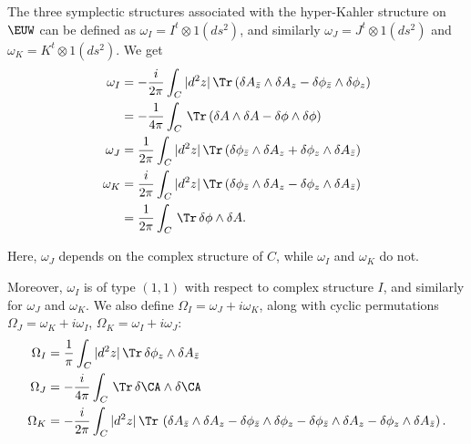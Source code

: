 \par{}

The three symplectic structures associated with the hyper-Kahler
structure on $\EUW$ can be defined as $\omega_I = I^t\otimes
1(ds^2)$, and similarly  $\omega_J=J^t\otimes 1(ds^2) $ and
$\omega_K=K^t\otimes 1(ds^2)$. We get %
\setcounter{equation}{7}
\begin{equation}\label{eq:tomog}
\begin{aligned}\omega_I
& = -{i\over 2\pi}\int_C|d^2z|\,\Tr\left(\delta A_{\bar z}\wedge
\delta A_z-\delta \phi_{\bar z}\wedge \delta\phi_z\right)\\
&=-{1\over 4\pi}\int_C\,\Tr\left(\delta A\wedge \delta A
-\delta\phi\wedge\delta \phi\right) \\
                      \omega_J & ={1\over 2\pi}\int_C |d^2z|\,\Tr\left(
                      \delta\phi_{\bar z}\wedge \delta A_z+\delta\phi_z\wedge
                      \delta A_{\bar z} \right)\\
                      \omega_K & =
                      {i\over 2\pi}\int_C|d^2z|\,\Tr\left(\delta\phi_{\bar z}
                      \wedge\delta A_z-\delta\phi_z\wedge\delta A_{\bar z}\right)\\
                      & = {1\over 2\pi}\int_C \,\Tr\,\delta\phi
                      \wedge\delta A.\\\end{aligned}
\end{equation}

Here, $\omega_J$ depends on the complex structure of $C$, while
$\omega_I$ and $\omega_K$ do not.

Moreover, $\omega_I$ is of type $(1,1)$ with respect to complex
structure $I$, and similarly for $\omega_J$ and $\omega_K$.  We
also define $\Omega_I=\omega_J+i\omega_K$, along with cyclic
permutations $\Omega_J=\omega_K+i\omega_I$,
$\Omega_K=\omega_I+i\omega_J$:
\setcounter{equation}{8}
\begin{equation}\label{eq:ninto}
\begin{aligned}\Omega_I & =
{1\over \pi}\int_C|d^2z|\,\Tr\,\delta\phi_z\wedge \delta A_{\bar
z} \\
        \Omega_J & =-{i\over 4\pi}\int_C\,\Tr\,\delta \CA\wedge\delta \CA          \\
        \Omega_K & = -{i\over 2\pi}\int_C |d^2z|\,\Tr\,\left( \delta A_{\bar z}\wedge
\delta A_z-\delta \phi_{\bar z}\wedge \delta\phi_z -
\delta\phi_{\bar z}\wedge \delta A_z-\delta\phi_z\wedge
                      \delta A_{\bar z}\right).\\\end{aligned}
\end{equation}

